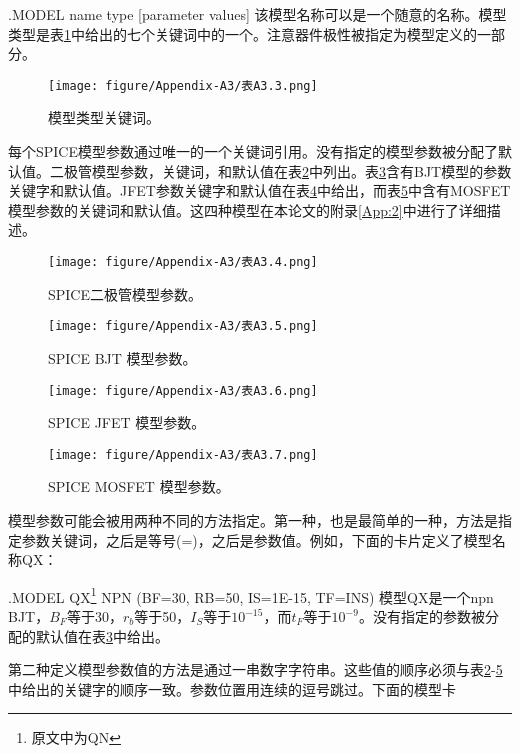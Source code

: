 .MODEL name type [parameter values]
该模型名称可以是一个随意的名称。模型类型是表\ref{表A3.3}中给出的七个关键词中的一个。注意器件极性被指定为模型定义的一部分。

\begin{figure}[htbp]
\small
    \centering
    \texttt{[image: figure/Appendix-A3/表A3.3.png]}
    \caption{模型类型关键词。}
    \label{表A3.3}
\end{figure}

每个SPICE模型参数通过唯一的一个关键词引用。没有指定的模型参数被分配了默认值。二极管模型参数，关键词，和默认值在表\ref{表A3.4}中列出。表\ref{表A3.5}含有BJT模型的参数关键字和默认值。JFET参数关键字和默认值在表\ref{表A3.6}中给出，而表\ref{表A3.7}中含有MOSFET模型参数的关键词和默认值。这四种模型在本论文的附录\ref{App:2}中进行了详细描述。

\begin{figure}[htbp]
\small
    \centering
    \texttt{[image: figure/Appendix-A3/表A3.4.png]}
    \caption{SPICE二极管模型参数。}
    \label{表A3.4}
\end{figure}

\begin{figure}[htbp]
\small
    \centering
    \texttt{[image: figure/Appendix-A3/表A3.5.png]}
    \caption{SPICE BJT 模型参数。}
    \label{表A3.5}
\end{figure}

\begin{figure}[htbp]
\small
    \centering
    \texttt{[image: figure/Appendix-A3/表A3.6.png]}
    \caption{SPICE JFET 模型参数。}
    \label{表A3.6}
\end{figure}

\begin{figure}[htbp]
\small
    \centering
    \texttt{[image: figure/Appendix-A3/表A3.7.png]}
    \caption{SPICE MOSFET 模型参数。}
    \label{表A3.7}
\end{figure}

模型参数可能会被用两种不同的方法指定。第一种，也是最简单的一种，方法是指定参数关键词，之后是等号(=)，之后是参数值。例如，下面的卡片定义了模型名称QX：

.MODEL QX\footnote{原文中为QN} NPN (BF=30, RB=50, IS=1E-15, TF=INS)
模型QX是一个npn BJT，$B_F$等于30，$r_b$等于50，$I_S$等于$10^{-15}$，而$t_F$等于$10^{-9}$。没有指定的参数被分配的默认值在表\ref{表A3.5}中给出。

第二种定义模型参数值的方法是通过一串数字字符串。这些值的顺序必须与表\ref{表A3.4}-\ref{表A3.7}中给出的关键字的顺序一致。参数位置用连续的逗号跳过。下面的模型卡


